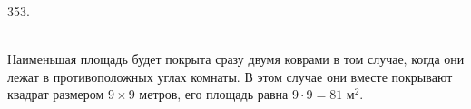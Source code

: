 353. \begin{figure}[ht!]
\end{figure}\\
Наименьшая площадь будет покрыта сразу двумя коврами в том случае, когда они лежат в противоположных углах комнаты. В этом случае они вместе покрывают квадрат размером $9\times9$ метров, его площадь равна $9\cdot9=81\text{ м}^2.$\newpage\noindent
